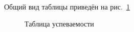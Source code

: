 Общий вид таблицы приведён на рис.~\ref{analytics:progress:table}
\begin{figure}[H]
	\caption{Таблица успеваемости}
	\label{analytics:progress:table}
\end{figure}